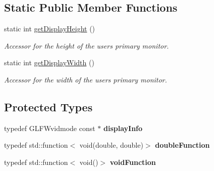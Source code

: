 \subsection*{Static Public Member Functions}
\begin{DoxyCompactItemize}
\item 
static int \hyperlink{classtsgl_1_1_canvas_a664b101f972845eaf5fdc4d9e664e623}{get\+Display\+Height} ()
\begin{DoxyCompactList}\small\item\em Accessor for the height of the user\textquotesingle{}s primary monitor. \end{DoxyCompactList}\item 
static int \hyperlink{classtsgl_1_1_canvas_abbe5c392cac2320fecf1f2751afb207c}{get\+Display\+Width} ()
\begin{DoxyCompactList}\small\item\em Accessor for the width of the user\textquotesingle{}s primary monitor. \end{DoxyCompactList}\end{DoxyCompactItemize}
\subsection*{Protected Types}
\begin{DoxyCompactItemize}
\item 
\mbox{\label{classtsgl_1_1_canvas_a95d585a23cb8e18fb2b13c80e7067747}} 
typedef G\+L\+F\+Wvidmode const  $\ast$ {\bfseries display\+Info}
\item 
\mbox{\label{classtsgl_1_1_canvas_accfc113faf9ee00124abbecd9a8177e8}} 
typedef std\+::function$<$ void(double, double)$>$ {\bfseries double\+Function}
\item 
\mbox{\label{classtsgl_1_1_canvas_aa72a71c102b09d0f71269ebea5034210}} 
typedef std\+::function$<$ void()$>$ {\bfseries void\+Function}
\end{DoxyCompactItemize}
